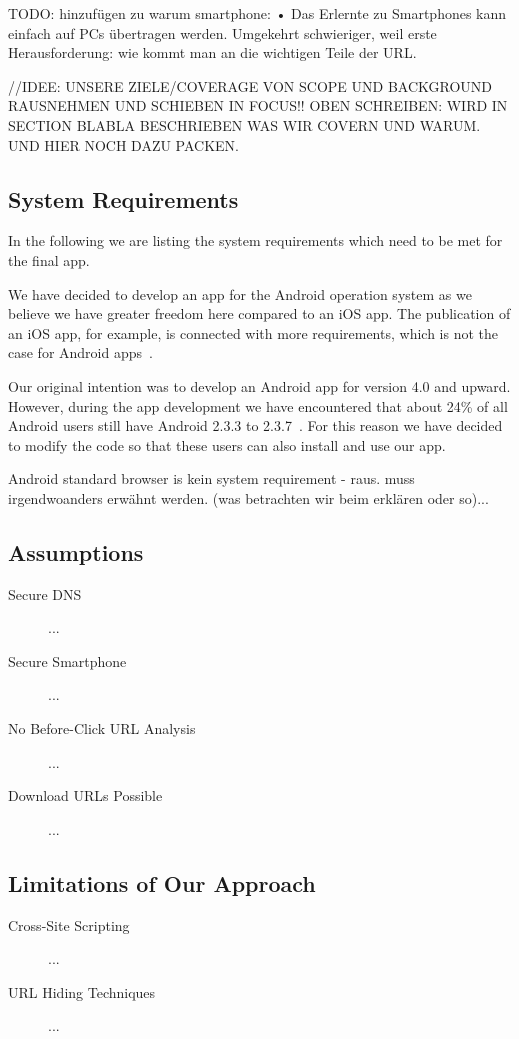 TODO: hinzufügen zu warum smartphone: •	Das Erlernte zu Smartphones kann einfach auf PCs übertragen werden. Umgekehrt schwieriger, weil erste Herausforderung: wie kommt man an die wichtigen Teile der URL.

//IDEE: UNSERE ZIELE/COVERAGE VON SCOPE UND BACKGROUND RAUSNEHMEN UND SCHIEBEN IN FOCUS!! OBEN SCHREIBEN: WIRD IN SECTION BLABLA BESCHRIEBEN WAS WIR COVERN UND WARUM. UND HIER NOCH DAZU PACKEN.


\subsection{System Requirements}
In the following we are listing the system requirements which need to be met for the final app.

\begin{description}[leftmargin=0cm]
	\item[Android] We have decided to develop an app for the Android operation system as we believe we have greater freedom here compared to an iOS app. The publication of an iOS app, for example, is connected with more requirements, which is not the case for Android apps~\cite{publishios, publishandroid}.
	\item[Version] Our original intention was to develop an Android app for version 4.0 and upward. However, during the app development we have encountered that about 24\% of all Android users still have Android 2.3.3 to 2.3.7~\cite{}. For this reason we have decided to modify the code so that these users can also install and use our app. 
	\item[Android Standard Browser] Android standard browser is kein system requirement - raus. muss irgendwoanders erwähnt werden. (was betrachten wir beim erklären oder so)...
\end{description}

\subsection{Assumptions}
\begin{description}
	\item[Secure DNS] ...
	\item[Secure Smartphone] ...
	\item[No Before-Click URL Analysis] ...
	\item[Download URLs Possible] ...
\end{description}

\subsection{Limitations of Our Approach}
\begin{description}
	\item[Cross-Site Scripting] ...
	\item[URL Hiding Techniques] ...
\end{description}

